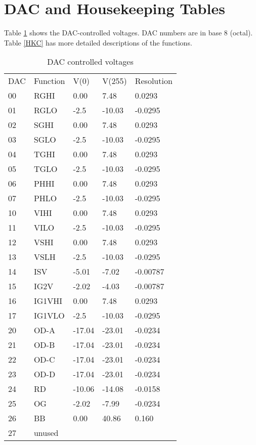 \documentclass[a4paper,12pt]{article}
\begin{document}
\clearpage
\section{DAC and Housekeeping Tables}

Table \ref{DACV} shows the DAC-controlled voltages. DAC numbers are in base 8 (octal). Table \ref{HKC} has more detailed descriptions of the functions.

\begin{table}[h]
\centering
\begin{tabular}{|l|l|l|l|l|}
\hline
DAC & Function & V(0) & V(255) & Resolution \\
00 & RGHI & 0.00 & 7.48 & 0.0293 \\
01 & RGLO & -2.5 & -10.03 & -0.0295 \\
02 & SGHI & 0.00 & 7.48 & 0.0293 \\
03 & SGLO & -2.5 & -10.03 & -0.0295 \\
04 & TGHI & 0.00 & 7.48 & 0.0293 \\
05 & TGLO & -2.5 & -10.03 & -0.0295 \\
06 & PHHI & 0.00 & 7.48 & 0.0293 \\
07 & PHLO & -2.5 & -10.03 & -0.0295 \\
10 & VIHI & 0.00 & 7.48 & 0.0293 \\
11 & VILO & -2.5 & -10.03 & -0.0295 \\
12 & VSHI & 0.00 & 7.48 & 0.0293 \\
13 & VSLH & -2.5 & -10.03 & -0.0295 \\
14 & ISV & -5.01 & -7.02 & -0.00787 \\
15 & IG2V & -2.02 & -4.03 & -0.00787 \\
16 & IG1VHI & 0.00 & 7.48 & 0.0293 \\
17 & IG1VLO & -2.5 & -10.03 & -0.0295 \\
20 & OD-A & -17.04 & -23.01 & -0.0234 \\
21 & OD-B & -17.04 & -23.01 & -0.0234 \\
22 & OD-C & -17.04 & -23.01 & -0.0234 \\
23 & OD-D & -17.04 & -23.01 & -0.0234 \\
24 & RD & -10.06 & -14.08 & -0.0158 \\
25 & OG & -2.02 & -7.99 & -0.0234 \\
26 & BB & 0.00 & 40.86 & 0.160 \\
27 & unused & & & \\
\hline
\end{tabular}
\caption{DAC controlled voltages}
\label{DACV}
\end{table}
\end{document}
